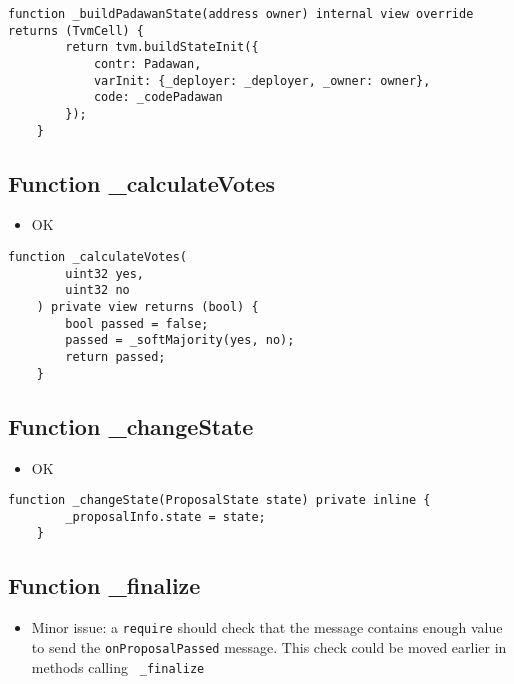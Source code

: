 \begin{lstlisting}[firstnumber=154]
    function _buildPadawanState(address owner) internal view override returns (TvmCell) {
        return tvm.buildStateInit({
            contr: Padawan,
            varInit: {_deployer: _deployer, _owner: owner},
            code: _codePadawan
        });
    }
\end{lstlisting}

\subsection{Function \_{}calculateVotes}

\begin{itemize}
\item OK
\end{itemize}

\begin{lstlisting}[firstnumber=132]
    function _calculateVotes(
        uint32 yes,
        uint32 no
    ) private view returns (bool) {
        bool passed = false;
        passed = _softMajority(yes, no);
        return passed;
    }
\end{lstlisting}

\subsection{Function \_{}changeState}

\begin{itemize}
\item OK
\end{itemize}

\begin{lstlisting}[firstnumber=150]
    function _changeState(ProposalState state) private inline {
        _proposalInfo.state = state;
    }
\end{lstlisting}

\subsection{Function \_{}finalize}

\begin{itemize}
\item Minor issue: a {\tt require} should check that the message
  contains enough value to send the {\tt onProposalPassed}
  message. This check could be moved earlier in methods calling {\tt
    \_finalize}
\end{itemize}

